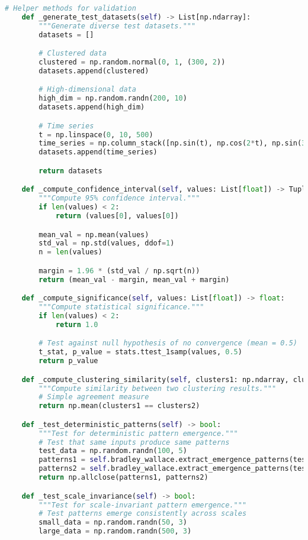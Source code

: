 \begin{lstlisting}[language=Python, caption=Complete Wallace Validation Framework Implementation]
    # Helper methods for validation
    def _generate_test_datasets(self) -> List[np.ndarray]:
        """Generate diverse test datasets."""
        datasets = []

        # Clustered data
        clustered = np.random.normal(0, 1, (300, 2))
        datasets.append(clustered)

        # High-dimensional data
        high_dim = np.random.randn(200, 10)
        datasets.append(high_dim)

        # Time series
        t = np.linspace(0, 10, 500)
        time_series = np.column_stack([np.sin(t), np.cos(2*t), np.sin(3*t)])
        datasets.append(time_series)

        return datasets

    def _compute_confidence_interval(self, values: List[float]) -> Tuple[float, float]:
        """Compute 95% confidence interval."""
        if len(values) < 2:
            return (values[0], values[0])

        mean_val = np.mean(values)
        std_val = np.std(values, ddof=1)
        n = len(values)

        margin = 1.96 * (std_val / np.sqrt(n))
        return (mean_val - margin, mean_val + margin)

    def _compute_significance(self, values: List[float]) -> float:
        """Compute statistical significance."""
        if len(values) < 2:
            return 1.0

        # Test against null hypothesis of no convergence (mean = 0.5)
        t_stat, p_value = stats.ttest_1samp(values, 0.5)
        return p_value

    def _compute_clustering_similarity(self, clusters1: np.ndarray, clusters2: np.ndarray) -> float:
        """Compute similarity between two clustering results."""
        # Simple agreement measure
        return np.mean(clusters1 == clusters2)

    def _test_deterministic_patterns(self) -> bool:
        """Test for deterministic pattern emergence."""
        # Test that same inputs produce same patterns
        test_data = np.random.randn(100, 5)
        patterns1 = self.bradley_wallace.extract_emergence_patterns(test_data)
        patterns2 = self.bradley_wallace.extract_emergence_patterns(test_data)
        return np.allclose(patterns1, patterns2)

    def _test_scale_invariance(self) -> bool:
        """Test for scale-invariant pattern emergence."""
        # Test patterns emerge consistently across scales
        small_data = np.random.randn(50, 3)
        large_data = np.random.randn(500, 3)


\end{lstlisting}
